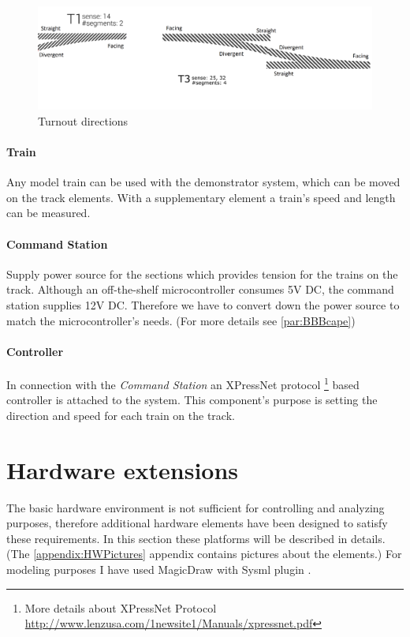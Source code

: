 \begin{figure}[ht]
	\centering
	\includegraphics[width=150mm]{figures/modes3/t1andt3.png}
	\caption{Turnout directions}
	\label{fig:turnoutDir}
\end{figure}

\paragraph{Train}
Any model train can be used with the demonstrator system, which can be moved on the track elements. With a supplementary element a train's speed and length can be measured.

\paragraph{Command Station} \label{basics:CS}
Supply power source for the sections which provides tension for the trains on the track. Although an off-the-shelf microcontroller consumes 5V DC, the command station supplies 12V DC. Therefore we have to convert down the power source to match the microcontroller's needs. (For more details see \autoref{par:BBBcape})


\paragraph{Controller}
In connection with the \textit{Command Station} an XPressNet protocol \footnote{More details about XPressNet Protocol \url{http://www.lenzusa.com/1newsite1/Manuals/xpressnet.pdf}} based controller is attached to the system. This component's purpose is setting the direction and speed for each train on the track.

\section{Hardware extensions}
The basic hardware environment is not sufficient for controlling and analyzing purposes, therefore additional hardware elements have been designed to satisfy these requirements. In this section these platforms will be described in details. (The \ref{appendix:HWPictures} appendix contains pictures about the elements.) For modeling purposes I have used MagicDraw with Sysml plugin \cite{SysML}.

